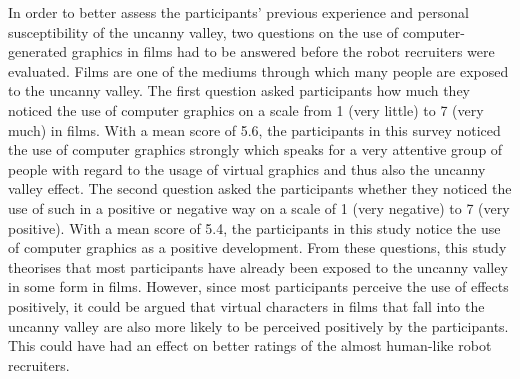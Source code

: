 In order to better assess the participants' previous experience and personal susceptibility of the uncanny valley, two questions on the use of computer-generated graphics in films had to be answered before the robot recruiters were evaluated. Films are one of the mediums through which many people are exposed to the uncanny valley. The first question asked participants how much they noticed the use of computer graphics on a scale from 1 (very little) to 7 (very much) in films. With a mean score of 5.6, the participants in this survey noticed the use of computer graphics strongly which speaks for a very attentive group of people with regard to the usage of virtual graphics and thus also the uncanny valley effect. The second question asked the participants whether they noticed the use of such in a positive or negative way on a scale of 1 (very negative) to 7 (very positive). With a mean score of 5.4, the participants in this study notice the use of computer graphics as a positive development. From these questions, this study theorises that most participants have already been exposed to the uncanny valley in some form in films. However, since most participants perceive the use of effects positively, it could be argued that virtual characters in films that fall into the uncanny valley are also more likely to be perceived positively by the participants. This could have had an effect on better ratings of the almost human-like robot recruiters.

